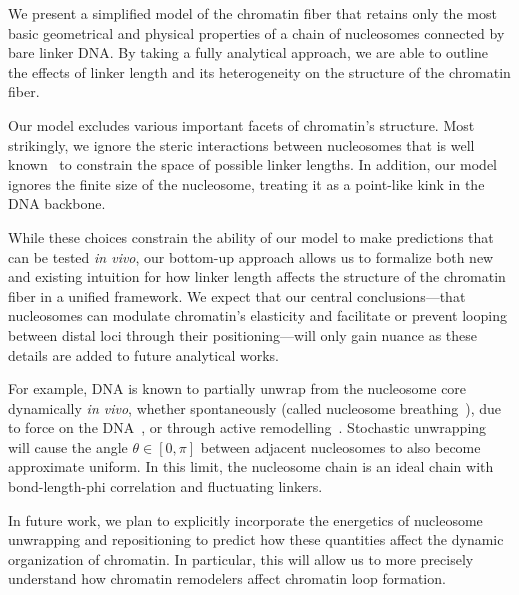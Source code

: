 \documentclass[%
 reprint,
superscriptaddress,
showpacs,preprintnumbers,
 amsmath,amssymb,
 aps,
 prl,
]{revtex4-1}
\begin{document}
We present a simplified model of the chromatin fiber that retains only the most
    basic geometrical and physical properties of a chain of nucleosomes
    connected by bare linker DNA.\@
By taking a fully analytical approach, we are able to outline the effects of
    linker length and its heterogeneity on the structure of the chromatin fiber.

Our model excludes various important facets of chromatin's structure.
Most strikingly, we ignore the steric interactions between nucleosomes that is
    well known~\cite{widom1992} to constrain the space of possible linker
    lengths.
In addition, our model ignores the finite size of the nucleosome, treating it as
    a point-like kink in the DNA backbone.

While these choices constrain the ability of our model to make predictions that
    can be tested \textit{in vivo}, our bottom-up approach allows us to
    formalize both new and existing intuition for how linker length affects the
    structure of the chromatin fiber in a unified framework.
We expect that our central conclusions---that nucleosomes can modulate
    chromatin's elasticity and facilitate or prevent looping between distal loci
    through their positioning---will only gain nuance as these details are added
    to future analytical works.

    For example, DNA is known to partially unwrap from the nucleosome core dynamically \textit{in
    vivo}, whether spontaneously (called nucleosome breathing~\cite{TODO}), due to
    force on the DNA~\cite{TODO}, or through active
    remodelling~\cite{dion2007,kulaeva2007,senavirathne2017}. Stochastic
    unwrapping will cause the angle $\theta \in [0, \pi]$ between adjacent nucleosomes to
    also become approximate uniform. In this limit, the nucleosome chain is an
    ideal chain with bond-length-phi correlation and fluctuating linkers. 
    
    In future work, we plan to explicitly incorporate the energetics of nucleosome unwrapping
    and repositioning to predict how these quantities affect the dynamic
    organization of chromatin. In particular, this will allow us to more
    precisely understand how chromatin remodelers affect chromatin loop
    formation.
\end{document}
